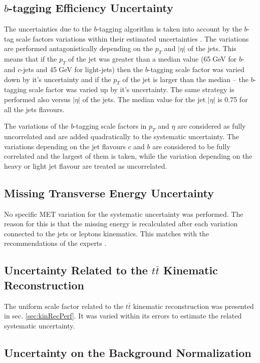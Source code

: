 \subsection{$b$-tagging Efficiency Uncertainty}

The uncertainties due to the $b$-tagging algorithm is taken into account by the $b$-tag scale factors variations within their estimated
uncertainties \cite{CMS-PAS-BTV-13-001}. The variations are performed antagonistically depending on the $p_{T}$ and $|\eta|$ of the jets.
This means that if the $p_{T}$ of the jet was greater than a median value (65$\;$GeV for $b$- and $c$-jets and 45$\;$GeV for light-jets) then 
the $b$-tagging scale factor was varied down by it's uncertainty and if the $p_{T}$ of the jet is larger than the median -- the $b$-tagging 
scale factor was varied up by it's uncertainty. The same strategy is performed also versus $|\eta|$
of the jets. The median value for the jet $|\eta|$ is 0.75 for all the jets flavours.

The variations of the $b$-tagging scale factors in $p_{T}$ and $\eta$ are considered as fully uncorrelated and are added
quadratically to the systematic uncertainty. The variations depending on the jet flavours $c$ and $b$ are considered to be 
fully correlated and the largest of them is taken, while the variation depending on the heavy or light jet flavour are treated as uncorrelated.

\subsection{Missing Transverse Energy Uncertainty}

No specific MET variation for the systematic uncertainty was performed. The reason for this is that the missing energy is recalculated
after each variation connected to the jets or leptons kinematics. This matches with the recommendations of the experts \cite{CMS-PAS-JME-12-002}.

\subsection{Uncertainty Related to the $t\bar{t}$ Kinematic Reconstruction}

The uniform scale factor related to the $t\bar{t}$ kinematic reconstruction was presented in sec. \ref{sec:kinRecPerf}. It was varied 
within its errors to estimate the related systematic uncertainty.

\subsection{Uncertainty on the Background Normalization}

